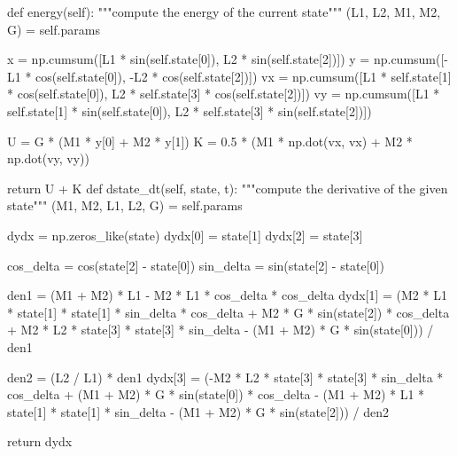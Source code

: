 \documentclass[12pt]{article}
\begin{document}
\pagebreak
\begin{boxedverbatim}                       
def energy(self):
        """compute the energy of the current state"""
        (L1, L2, M1, M2, G) = self.params

        x = np.cumsum([L1 * sin(self.state[0]),
                       L2 * sin(self.state[2])])
        y = np.cumsum([-L1 * cos(self.state[0]),
                       -L2 * cos(self.state[2])])
        vx = np.cumsum([L1 * self.state[1] * cos(self.state[0]),
                        L2 * self.state[3] * cos(self.state[2])])
        vy = np.cumsum([L1 * self.state[1] * sin(self.state[0]),
                        L2 * self.state[3] * sin(self.state[2])])

        U = G * (M1 * y[0] + M2 * y[1])
        K = 0.5 * (M1 * np.dot(vx, vx) + M2 * np.dot(vy, vy))

        return U + K
 def dstate_dt(self, state, t):
         """compute the derivative of the given state"""
         (M1, M2, L1, L2, G) = self.params
 
         dydx = np.zeros_like(state)
         dydx[0] = state[1]
         dydx[2] = state[3]
 
         cos_delta = cos(state[2] - state[0])
         sin_delta = sin(state[2] - state[0])
 
         den1 = (M1 + M2) * L1 - M2 * L1 * cos_delta * cos_delta
         dydx[1] = (M2 * L1 * state[1] * state[1] * sin_delta * cos_delta
                    + M2 * G * sin(state[2]) * cos_delta
                    + M2 * L2 * state[3] * state[3] * sin_delta
                    - (M1 + M2) * G * sin(state[0])) / den1
 
         den2 = (L2 / L1) * den1
         dydx[3] = (-M2 * L2 * state[3] * state[3] * sin_delta * cos_delta
                    + (M1 + M2) * G * sin(state[0]) * cos_delta
                    - (M1 + M2) * L1 * state[1] * state[1] * sin_delta
                    - (M1 + M2) * G * sin(state[2])) / den2
         
         return dydx
\end{boxedverbatim}

\pagebreak
\end{document}
